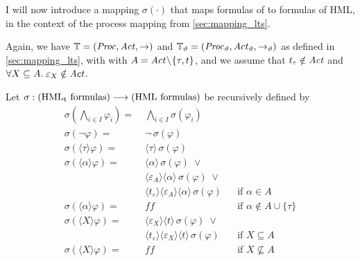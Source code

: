 %
\begin{isabellebody}%
%
%
\isadelimtheory
%
\endisadelimtheory
%
\isatagtheory
%
\endisatagtheory
{\isafoldtheory}%
%
\isadelimtheory
%
\endisadelimtheory
%
\isadelimdocument
%
\endisadelimdocument
%
\isatagdocument
%
\isamarkuptrue%
%
\endisatagdocument
{\isafolddocument}%
%
\isadelimdocument
%
\endisadelimdocument
%
\begin{isamarkuptext}%
\label{sec:mapping_formulas}%
\end{isamarkuptext}\isamarkuptrue%
%
\begin{isamarkuptext}%
I will now introduce a mapping $\sigma(\cdot)$ that maps formulas of \HMLt{} to formulas of HML, in the context of the process mapping from \cref{sec:mapping_lts}.

Again, we have $\mathbb{T} = (\mathit{Proc}, \mathit{Act}, \rightarrow)$ and $\mathbb{T}_\vartheta = (\mathit{Proc}_\vartheta, \mathit{Act}_\vartheta, \rightarrow_\vartheta)$ as defined in \cref{sec:mapping_lts}, with with $A = \mathit{Act} \!\setminus\! \{\tau, t\}$, and we assume that $t_\varepsilon \notin \mathit{Act}$ and $\forall X \subseteq A.\; \varepsilon_X \notin \mathit{Act}$.

Let $\sigma : (\text{HML\textsubscript{t}{} formulas}) \longrightarrow (\text{HML formulas})$ be recursively defined by
\begin{align*}
    \sigma(\textstyle\bigwedge_{i \in I} \varphi_i) =\;& \textstyle\bigwedge_{i \in I} \sigma(\varphi_i) &\\
    \sigma(\neg\varphi) =\;& \neg\,\sigma(\varphi)\\
    \sigma(\langle\tau\rangle\varphi) =\;& \langle\tau\rangle\,\sigma(\varphi)\\
    \sigma(\langle\alpha\rangle\varphi) =\;& 
        \langle\alpha\rangle\,\sigma(\varphi)\;\vee\\
        &\langle\varepsilon_A\rangle\langle\alpha\rangle\,\sigma(\varphi)\;\vee\\ 
        &\langle{}t_\varepsilon\rangle\langle\varepsilon_A\rangle\langle\alpha\rangle\,\sigma(\varphi) && \text{if $\alpha \in A$}\\
    \sigma(\langle\alpha\rangle\varphi) =\;& f\!\!f && \text{if $\alpha \notin A \cup \{\tau\}$}\\
    \sigma(\langle{}X\rangle\varphi) =\;&
        \langle\varepsilon_X\rangle\langle{}t\rangle\,\sigma(\varphi)\;\vee\\
        &\langle{}t_\varepsilon\rangle\langle\varepsilon_X\rangle\langle{}t\rangle\,\sigma(\varphi) && \text{if $X \subseteq A$} \\
    \sigma(\langle{}X\rangle\varphi) =\;& f\!\!f && \text{if $X \not\subseteq A$}
\end{align*}


\end{isamarkuptext}
\end{isabellebody}
